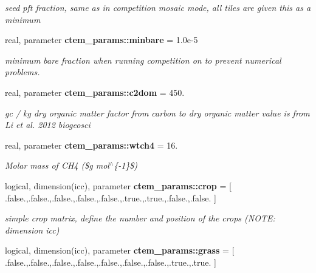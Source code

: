 \begin{DoxyCompactItemize}
\begin{DoxyCompactList}\small\item\em seed pft fraction, same as in competition  mosaic mode, all tiles are given this as a minimum \end{DoxyCompactList}\item 
\hypertarget{namespacectem__params_a4e93696e56f999aa1005c61d4ed25789}{}real, parameter {\bfseries ctem\+\_\+params\+::minbare} = 1.\+0e-\/5\label{namespacectem__params_a4e93696e56f999aa1005c61d4ed25789}

\begin{DoxyCompactList}\small\item\em minimum bare fraction when running competition on to prevent numerical problems. \end{DoxyCompactList}\item 
\hypertarget{namespacectem__params_a6acddc90acef172ea5a361fd7e628696}{}real, parameter {\bfseries ctem\+\_\+params\+::c2dom} = 450.\label{namespacectem__params_a6acddc90acef172ea5a361fd7e628696}

\begin{DoxyCompactList}\small\item\em gc / kg dry organic matter  factor from carbon to dry organic matter value is from Li et al. 2012 biogeosci \end{DoxyCompactList}\item 
\hypertarget{namespacectem__params_a5246c472162b5b9f071d4e55d87ee84c}{}real, parameter {\bfseries ctem\+\_\+params\+::wtch4} = 16.\label{namespacectem__params_a5246c472162b5b9f071d4e55d87ee84c}

\begin{DoxyCompactList}\small\item\em Molar mass of C\+H4 (\$g mol$^\wedge$\{-\/1\}\$) \end{DoxyCompactList}\item 
\hypertarget{namespacectem__params_ae0f698eacc7fc8a7cfd68a15a90b4e8f}{}logical, dimension(icc), parameter {\bfseries ctem\+\_\+params\+::crop} = \mbox{[} .false.,.false.,.false.,.false.,.false.,.true.,.true.,.false.,.false. \mbox{]}\label{namespacectem__params_ae0f698eacc7fc8a7cfd68a15a90b4e8f}

\begin{DoxyCompactList}\small\item\em simple crop matrix, define the number and position of the crops (N\+O\+T\+E\+: dimension icc) \end{DoxyCompactList}\item 
\hypertarget{namespacectem__params_aa3cfb14989b4145f054926e8eea3382f}{}logical, dimension(icc), parameter {\bfseries ctem\+\_\+params\+::grass} = \mbox{[} .false.,.false.,.false.,.false.,.false.,.false.,.false.,.true.,.true. \mbox{]}\label{namespacectem__params_aa3cfb14989b4145f054926e8eea3382f}


\end{DoxyCompactItemize}
